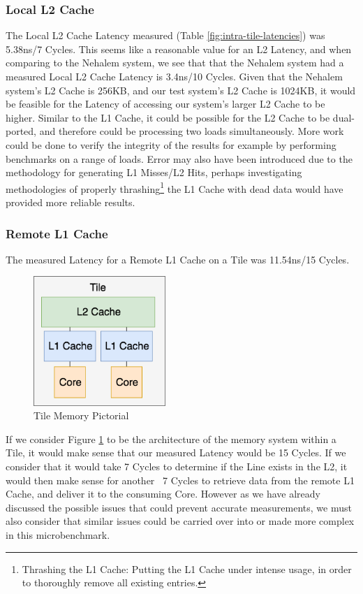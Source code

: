 \documentclass[bsc,frontabs,twoside,singlespacing,parskip,deptreport]{infthesis}     %
\begin{document}
\subsubsection{Local L2 Cache}
The Local L2 Cache Latency measured (Table \ref{fig:intra-tile-latencies}) was 5.38ns/7 Cycles. This seems like a reasonable value for an L2 Latency, and when comparing to the Nehalem system, we see that that the Nehalem system had a measured Local L2 Cache Latency is 3.4ns/10 Cycles. Given that the Nehalem system's L2 Cache is 256KB, and our test system's L2 Cache is 1024KB, it would be feasible for the Latency of accessing our system's larger L2 Cache to be higher. Similar to the L1 Cache, it could be possible for the L2 Cache to be dual-ported, and therefore could be processing two loads simultaneously. More work could be done to verify the integrity of the results for example by performing benchmarks on a range of loads. Error may also have been introduced due to the methodology for generating L1 Misses/L2 Hits, perhaps investigating methodologies of properly thrashing\footnote{Thrashing the L1 Cache: Putting the L1 Cache under intense usage, in order to thoroughly remove all existing entries.} the L1 Cache with dead data would have provided more reliable results.

\subsubsection{Remote L1 Cache}
The measured Latency for a Remote L1 Cache on a Tile was 11.54ns/15 Cycles. \\

\begin{figure}[!h]
    \centering
    \includegraphics[width=5cm]{Tile.png}
    \caption{Tile Memory Pictorial}
    \label{fig:tile-memory}
\end{figure}
If we consider Figure \ref{fig:tile-memory} to be the architecture of the memory system within a Tile, it would make sense that our measured Latency would be 15 Cycles. If we consider that it would take 7 Cycles to determine if the Line exists in the L2, it would then make sense for another ~7 Cycles to retrieve data from the remote L1 Cache, and deliver it to the consuming Core. However as we have already discussed the possible issues that could prevent accurate measurements, we must also consider that similar issues could be carried over into or made more complex in this microbenchmark.
\end{document}
